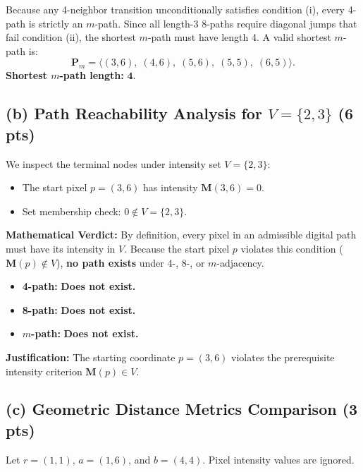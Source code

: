 \documentclass[11pt,a4paper]{article}
\begin{document}
Because any 4-neighbor transition unconditionally satisfies condition (i), every 4-path is strictly an $m$-path. Since all length-3 8-paths require diagonal jumps that fail condition (ii), the shortest $m$-path must have length 4. A valid shortest $m$-path is:
\begin{equation}
\mathbf{P}_m = \langle (3, 6), \; (4, 6), \; (5, 6), \; (5, 5), \; (6, 5) \rangle.
\end{equation}
\noindent\textbf{Shortest $m$-path length:} $\mathbf{4}$.

\subsection{(b) Path Reachability Analysis for $V = \{2, 3\}$ (6 pts)}
We inspect the terminal nodes under intensity set $V = \{2, 3\}$:
\begin{itemize}
    \item The start pixel $p = (3, 6)$ has intensity $\mathbf{M}(3, 6) = 0$.
    \item Set membership check: $0 \notin V = \{2, 3\}$.
\end{itemize}
\noindent\textbf{Mathematical Verdict:} By definition, every pixel in an admissible digital path must have its intensity in $V$. Because the start pixel $p$ violates this condition ($\mathbf{M}(p) \notin V$), \textbf{no path exists} under 4-, 8-, or $m$-adjacency.
\begin{itemize}
    \item \textbf{4-path:} \textbf{Does not exist.}
    \item \textbf{8-path:} \textbf{Does not exist.}
    \item \textbf{$m$-path:} \textbf{Does not exist.}
\end{itemize}
\noindent\textbf{Justification:} The starting coordinate $p=(3, 6)$ violates the prerequisite intensity criterion $\mathbf{M}(p) \in V$.

\subsection{(c) Geometric Distance Metrics Comparison (3 pts)}
Let $r = (1, 1)$, $a = (1, 6)$, and $b = (4, 4)$. Pixel intensity values are ignored.
\end{document}
